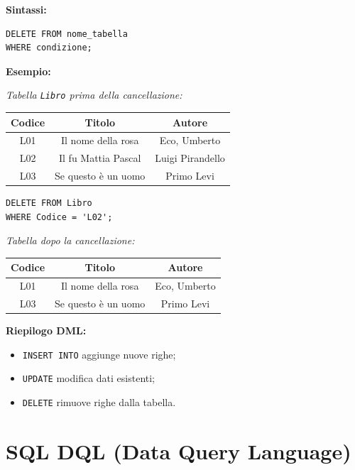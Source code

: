 \documentclass[a4paper,12pt]{article}
\newcommand{\code}[1]{\texttt{#1}}
\begin{document}
\textbf{Sintassi:}
\begin{verbatim}
DELETE FROM nome_tabella
WHERE condizione;
\end{verbatim}

\textbf{Esempio:}

\textit{Tabella \texttt{Libro} prima della cancellazione:}
\begin{center}
\begin{tabular}{|c|c|c|}
\hline
Codice & Titolo & Autore \\
\hline
L01 & Il nome della rosa & Eco, Umberto \\
L02 & Il fu Mattia Pascal & Luigi Pirandello \\
L03 & Se questo è un uomo & Primo Levi \\
\hline
\end{tabular}
\end{center}

\begin{verbatim}
DELETE FROM Libro
WHERE Codice = 'L02';
\end{verbatim}

\textit{Tabella dopo la cancellazione:}
\begin{center}
\begin{tabular}{|c|c|c|}
\hline
Codice & Titolo & Autore \\
\hline
L01 & Il nome della rosa & Eco, Umberto \\
L03 & Se questo è un uomo & Primo Levi \\
\hline
\end{tabular}
\end{center}

\bigskip
\textbf{Riepilogo DML:}
\begin{itemize}
    \item \code{INSERT INTO} aggiunge nuove righe;
    \item \code{UPDATE} modifica dati esistenti;
    \item \code{DELETE} rimuove righe dalla tabella.
\end{itemize}




\newpage
\section{SQL DQL (Data Query Language)}
\end{document}
